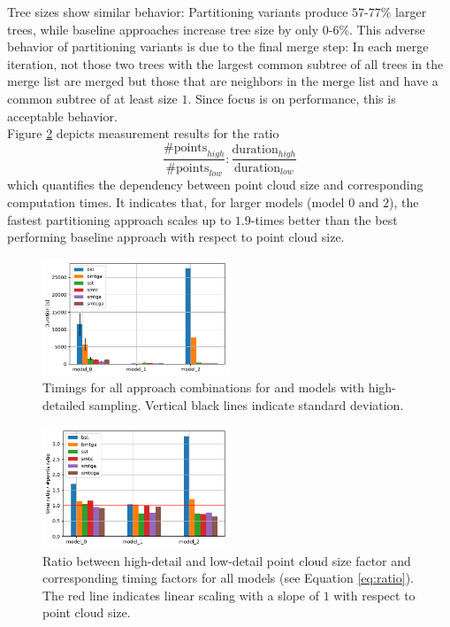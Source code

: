 Tree sizes show similar behavior:
Partitioning variants produce $57$-$77\%$ larger trees, while baseline approaches increase tree size by only $0$-$6\%$.
This adverse behavior of partitioning variants is due to the final merge step:
In each merge iteration, not those two trees with the largest common subtree of all trees in the merge list are merged but those that are neighbors in the merge list and have a common subtree of at least size $1$.
Since focus is on performance, this is acceptable behavior.
\\
Figure \ref{fig:graph3} depicts measurement results for the ratio
\begin{equation} \label{eq:ratio}
\frac{\#\text{points}_{high}}{\#\text{points}_{low}} : \frac{\text{duration}_{high}}{\text{duration}_{low}}
\end{equation}
which quantifies the dependency between point cloud size and corresponding computation times.
It indicates that, for larger models (model $0$ and $2$), the fastest partitioning approach scales up to $1.9$-times better than the best performing baseline approach with respect to point cloud size.
\begin{figure}[htb]
	\centering
	\includegraphics[width=0.5\textwidth]{figures/g1.pdf}
	\caption{Timings for all approach combinations for and models with high-detailed sampling. Vertical black lines indicate standard deviation.}
	\label{fig:graph1}
\end{figure}
\begin{figure}[htb]
	\centering
	\includegraphics[width=0.5\textwidth]{figures/g3.pdf}
	\caption{Ratio between high-detail and low-detail point cloud size factor and corresponding timing factors for all models (see Equation \ref{eq:ratio}). The red line indicates linear scaling with a slope of $1$ with respect to point cloud size.}
	\label{fig:graph3}
\end{figure}

